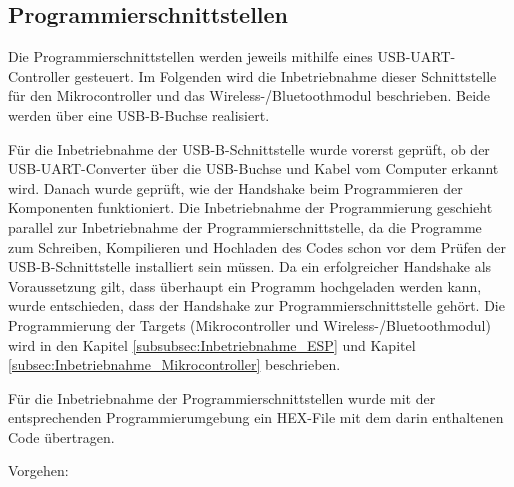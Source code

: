 \newpage
\subsection{Programmierschnittstellen}
\label{sec:Inbetriebnahme_Programmierschnittstellen}

Die Programmierschnittstellen werden jeweils mithilfe eines USB-UART-Controller gesteuert. Im Folgenden wird die Inbetriebnahme dieser Schnittstelle für den Mikrocontroller und das Wireless-/Bluetoothmodul beschrieben. Beide werden über eine USB-B-Buchse realisiert.

Für die Inbetriebnahme der USB-B-Schnittstelle wurde vorerst geprüft, ob der USB-UART-Converter über die USB-Buchse und Kabel vom Computer erkannt wird. Danach wurde geprüft, wie der Handshake beim Programmieren der Komponenten funktioniert. Die Inbetriebnahme der Programmierung geschieht parallel zur Inbetriebnahme der Programmierschnittstelle, da die Programme zum Schreiben, Kompilieren und Hochladen des Codes schon vor dem Prüfen der USB-B-Schnittstelle installiert sein müssen. Da ein erfolgreicher Handshake als Voraussetzung gilt, dass überhaupt ein Programm hochgeladen werden kann, wurde entschieden, dass der Handshake zur Programmierschnittstelle gehört. Die Programmierung der Targets (Mikrocontroller und Wireless-/Bluetoothmodul) wird in den Kapitel \ref{subsubsec:Inbetriebnahme_ESP} und Kapitel \ref{subsec:Inbetriebnahme_Mikrocontroller} beschrieben. 

Für die Inbetriebnahme der Programmierschnittstellen wurde mit der entsprechenden Programmierumgebung ein HEX-File mit dem darin enthaltenen Code übertragen.

Vorgehen:


